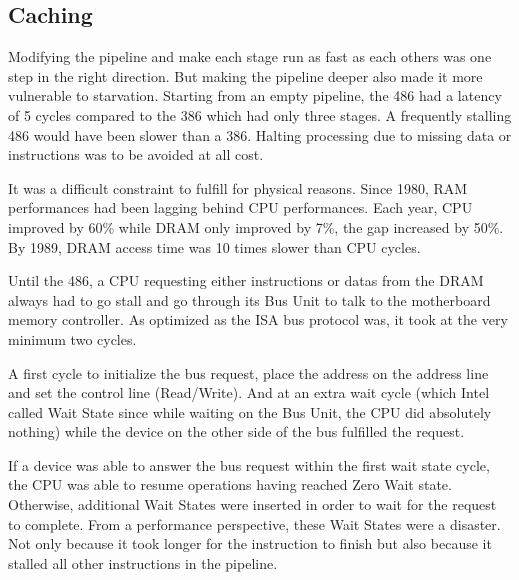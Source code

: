 \subsection{Caching }
Modifying the pipeline and make each stage run as fast as each others was one step in the right direction. But making the pipeline deeper also made it more vulnerable to starvation. Starting from an empty pipeline, the 486 had a latency of 5 cycles compared to the 386 which had only three stages. A frequently stalling 486 would have been slower than a 386. Halting processing due to missing data or instructions was to be avoided at all cost.\\
\par
It was a difficult constraint to fulfill for physical reasons. Since 1980, RAM performances had been lagging behind CPU performances. Each year, CPU improved by 60\% while DRAM only improved by 7\%, the gap increased by 50\%. By 1989, DRAM access time was 10 times slower than CPU cycles.\\
\par
\vspace{2mm}
\par
Until the 486, a CPU requesting either instructions or datas from the DRAM always had to go stall and go through its Bus Unit to talk to the motherboard memory controller. As optimized as the ISA bus protocol was, it took at the very minimum two cycles.\\
\par 
A first cycle to initialize the bus request, place the address on the address line and set the control line (Read/Write). And at an extra wait cycle (which Intel called Wait State since while waiting on the Bus Unit, the CPU did absolutely nothing) while the device on the other side of the bus fulfilled the request.\\
\par
{}
\par
If a device was able to answer the bus request within the first wait state cycle, the CPU was able to resume operations having reached Zero Wait state. Otherwise, additional Wait States were inserted in order to wait for the request to complete. From a performance perspective, these Wait States were a disaster. Not only because it took longer for the instruction to finish but also because it stalled all other instructions in the pipeline.\\
\par
{}
\par
